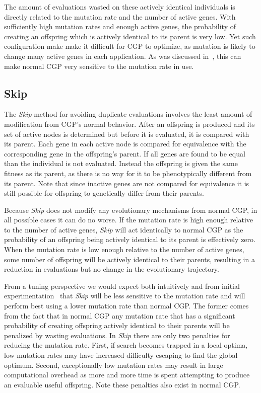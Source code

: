 \documentclass[journal]{IEEEtran}
\begin{document}
The amount of evaluations wasted on these actively identical individuals is
directly related to the mutation rate and the number of active genes.  With
sufficiently high mutation rates and enough active genes, the probability of
creating an offspring which is actively identical to its parent is very low.
Yet such configuration make make it difficult for CGP to optimize, as mutation
is likely to change many active genes in each application.  As was discussed
in~\cite{goldman:2013:cgpwaste}, this can make normal CGP very sensitive to the
mutation rate in use.

\subsection{Skip}
The \emph{Skip} method for avoiding duplicate evaluations involves the least
amount of modification from CGP's normal behavior.  After an offspring is produced
and its set of active nodes is determined but before it is evaluated, it is compared
with its parent.  Each gene in each active node is compared for equivalence with
the corresponding gene in the offspring's parent.  If all genes are found to be equal
than the individual is not evaluated.  Instead the offspring is given the same fitness
as its parent, as there is no way for it to be phenotypically different from its parent.
Note that since inactive genes are not compared for equivalence it is still possible
for offspring to genetically differ from their parents.

Because \emph{Skip} does not modify any evolutionary mechanisms from normal CGP,
in all possible cases it can do no worse.  If the mutation rate is high enough relative
to the number of active genes, \emph{Skip} will act identically to normal CGP as
the probability of an offspring being actively identical to its parent is effectively zero.
When the mutation rate is low enough relative to the number of active genes, some number of
offspring will be actively identical to their parents, resulting in a reduction in evaluations
but no change in the evolutionary trajectory.

From a tuning perspective we would expect both intuitively and from initial
experimentation~\cite{goldman:2013:cgpwaste} that \emph{Skip} will be less sensitive
to the mutation rate and will perform best using a lower mutation rate than normal CGP.
The former comes from the fact that in normal CGP any mutation rate that has a significant
probability of creating offspring actively identical to their parents will be penalized
by wasting evaluations.  In \emph{Skip} there are only two penalties for reducing the
mutation rate.  First, if search becomes trapped in a local optima, low mutation
rates may have increased difficulty escaping to find the global optimum.  Second,
exceptionally low mutation rates may result in large computational overhead as
more and more time is spent attempting to produce an evaluable useful offspring.
Note these penalties also exist in normal CGP.
\end{document}
